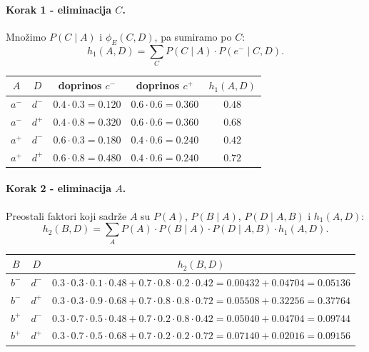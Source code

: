 \documentclass[12pt,a4paper]{article}
\begin{document}
\paragraph{Korak 1 - eliminacija $C$.}
Množimo $P(C\mid A)$ i $\phi_E(C,D)$, pa sumiramo po $C$:
\[
  h_1(A,D) = \sum_C P(C\mid A)\cdot P(e^-\mid C,D).
\]

\begin{center}
\begin{tabular}{cc|cc|c}
  \toprule
  $A$ & $D$ & doprinos $c^-$ & doprinos $c^+$ & $h_1(A,D)$ \\
  \midrule
  $a^-$ & $d^-$ & $0.4\cdot 0.3 = 0.120$ & $0.6\cdot 0.6 = 0.360$ & $0.48$ \\
  $a^-$ & $d^+$ & $0.4\cdot 0.8 = 0.320$ & $0.6\cdot 0.6 = 0.360$ & $0.68$ \\
  $a^+$ & $d^-$ & $0.6\cdot 0.3 = 0.180$ & $0.4\cdot 0.6 = 0.240$ & $0.42$ \\
  $a^+$ & $d^+$ & $0.6\cdot 0.8 = 0.480$ & $0.4\cdot 0.6 = 0.240$ & $0.72$ \\
  \bottomrule
\end{tabular}
\end{center}

\paragraph{Korak 2 - eliminacija $A$.}
Preostali faktori koji sadrže $A$ su $P(A)$, $P(B\mid A)$, $P(D\mid A,B)$ i $h_1(A,D)$:
\[
  h_2(B,D) = \sum_A P(A)\cdot P(B\mid A)\cdot P(D\mid A,B)\cdot h_1(A,D).
\]

\begin{center}
\begin{tabular}{cc|c}
  \toprule
  $B$ & $D$ & $h_2(B,D)$ \\
  \midrule
  $b^-$ & $d^-$ & $0.3\!\cdot\!0.3\!\cdot\!0.1\!\cdot\!0.48 + 0.7\!\cdot\!0.8\!\cdot\!0.2\!\cdot\!0.42
                   = 0.00432 + 0.04704 = 0.05136$ \\
  $b^-$ & $d^+$ & $0.3\!\cdot\!0.3\!\cdot\!0.9\!\cdot\!0.68 + 0.7\!\cdot\!0.8\!\cdot\!0.8\!\cdot\!0.72
                   = 0.05508 + 0.32256 = 0.37764$ \\
  $b^+$ & $d^-$ & $0.3\!\cdot\!0.7\!\cdot\!0.5\!\cdot\!0.48 + 0.7\!\cdot\!0.2\!\cdot\!0.8\!\cdot\!0.42
                   = 0.05040 + 0.04704 = 0.09744$ \\
  $b^+$ & $d^+$ & $0.3\!\cdot\!0.7\!\cdot\!0.5\!\cdot\!0.68 + 0.7\!\cdot\!0.2\!\cdot\!0.2\!\cdot\!0.72
                   = 0.07140 + 0.02016 = 0.09156$ \\
  \bottomrule
\end{tabular}
\end{center}
\end{document}
